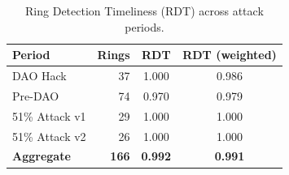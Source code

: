 \begin{table}[t]
\centering
\caption{Ring Detection Timeliness (RDT) across attack periods.}
\label{tab:rdt}
\begin{tabular}{lrcc}
\toprule
\textbf{Period} & \textbf{Rings} & \textbf{RDT} & \textbf{RDT (weighted)} \\
\midrule
DAO Hack             & 37  & 1.000 & 0.986 \\
Pre-DAO              & 74  & 0.970 & 0.979 \\
51\% Attack v1       & 29  & 1.000 & 1.000 \\
51\% Attack v2       & 26  & 1.000 & 1.000 \\
\midrule
\textbf{Aggregate} & \textbf{166} & \textbf{0.992} & \textbf{0.991} \\
\bottomrule
\end{tabular}
\end{table}
